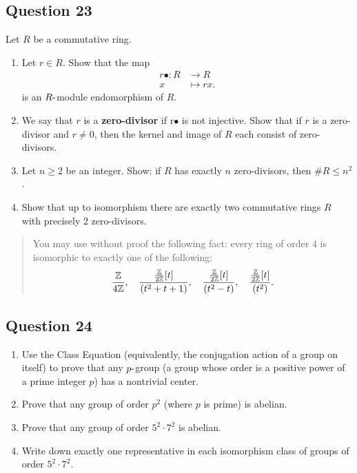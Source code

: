 \documentclass[12pt]{article}
\begin{document}
\hypertarget{question-23}{%
\subsection{Question 23}\label{question-23}}

Let \(R\) be a commutative ring.

\begin{enumerate}
\def\labelenumi{(\alph{enumi})}
\item
  Let \(r \in R\). Show that the map \begin{align*}
  r\bullet : R &\to R \\
  x &\mapsto r x
  .\end{align*} is an \(R{\hbox{-}}\)module endomorphism of \(R\).
\item
  We say that \(r\) is a \textbf{zero-divisor} if r\(\bullet\) is not
  injective. Show that if \(r\) is a zero-divisor and \(r \neq 0\), then
  the kernel and image of \(R\) each consist of zero-divisors.
\item
  Let \(n \geq 2\) be an integer. Show: if \(R\) has exactly \(n\)
  zero-divisors, then \(\#R \leq n^2\) .
\item
  Show that up to isomorphism there are exactly two commutative rings
  \(R\) with precisely 2 zero-divisors.
\end{enumerate}

\begin{quote}
You may use without proof the following fact: every ring of order 4 is
isomorphic to exactly one of the following: \[
\frac{ {\mathbb{Z}} }{ 4{\mathbb{Z}}}, \quad
\frac{ \frac{  {\mathbb{Z}} }{ 2{\mathbb{Z}}} [t]}{(t^2 + t + 1)}, \quad
\frac{ \frac{ {\mathbb{Z}} }{ 2{\mathbb{Z}}} [t]}{ (t^2 - t)}, \quad
\frac{ \frac{ {\mathbb{Z}}}{2{\mathbb{Z}}}[t]}{(t^2 )}
.\]
\end{quote}

\hypertarget{question-24}{%
\subsection{Question 24}\label{question-24}}

\begin{enumerate}
\def\labelenumi{(\alph{enumi})}
\item
  Use the Class Equation (equivalently, the conjugation action of a
  group on itself) to prove that any \(p{\hbox{-}}\)group (a group whose
  order is a positive power of a prime integer \(p\)) has a nontrivial
  center.
\item
  Prove that any group of order \(p^2\) (where \(p\) is prime) is
  abelian.
\item
  Prove that any group of order \(5^2 \cdot 7^2\) is abelian.
\item
  Write down exactly one representative in each isomorphism class of
  groups of order \(5^2 \cdot 7^2\).
\end{enumerate}
\end{document}
